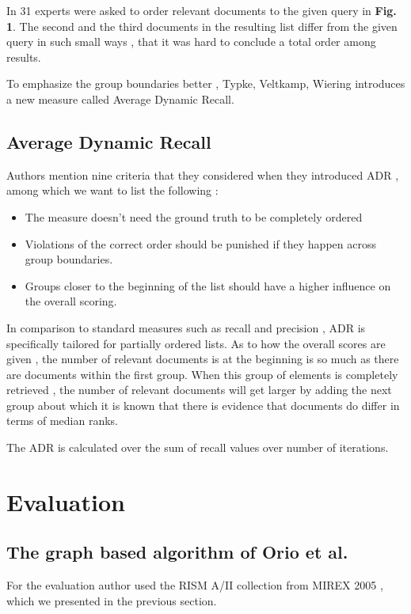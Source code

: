 \documentclass{llncs}
\begin{document}
 		In \cite{two_point_four_point_four} 31 experts were asked to order relevant documents to the given query in \textbf{Fig. 1}. The second and the third documents in the resulting list differ from the given query in such small ways , that it was hard to conclude a total order among results.

 		To emphasize the group boundaries better , Typke, Veltkamp, Wiering \cite{two_point_four_point_four} introduces a new measure called Average Dynamic Recall. 

		\subsection{Average Dynamic Recall}
			
			
			Authors mention nine criteria that they considered when they introduced ADR , among which we want to list the following :

			\begin{itemize}
				\item The measure doesn't need the ground truth to be completely ordered
				\item Violations of the correct order should be punished if they happen across group boundaries.
				\item Groups closer to the beginning of the list should have a higher influence on the overall scoring.
			\end{itemize}

			In comparison to standard measures such as recall and precision , ADR is specifically tailored for partially ordered lists. As to how the overall scores are given , the number of relevant documents is at the beginning is so much as there are documents within the first group. When this group of elements is completely retrieved , the number of relevant documents will get larger by adding the next group about which it is known that there is evidence that documents do differ in terms of median ranks.

			The ADR is calculated over the sum of recall values over number of iterations.     

	\section{Evaluation}
		\subsection{The graph based algorithm of Orio et al.}
			For the evaluation author used the RISM A/II collection from MIREX 2005  , which we  presented in the previous section.
\end{document}
